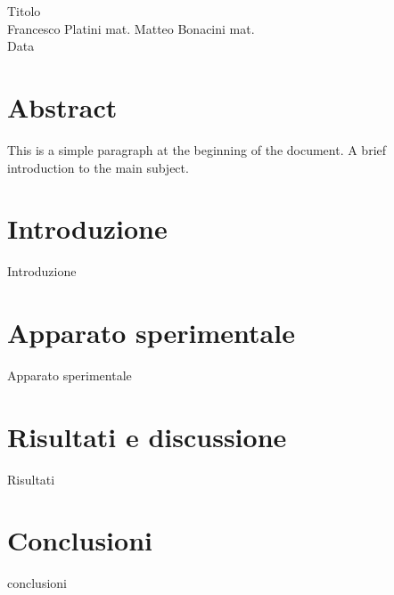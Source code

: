 \documentclass[12pt, letterpaper, twoside]{article}
\begin{document}
\begin{center}
    \huge Titolo \\
    \vspace{0.5cm}
    \large Francesco Platini mat. Matteo Bonacini mat.\\
    \vspace*{1pt}
    Data

\end{center}
\singlespacing

\section{Abstract}
This is a simple paragraph at the beginning of the document. A brief introduction to the main subject.
\section{Introduzione}
Introduzione
\section{Apparato sperimentale}
Apparato sperimentale
\section{Risultati e discussione}
Risultati
\section{Conclusioni}
conclusioni
\end{document}
